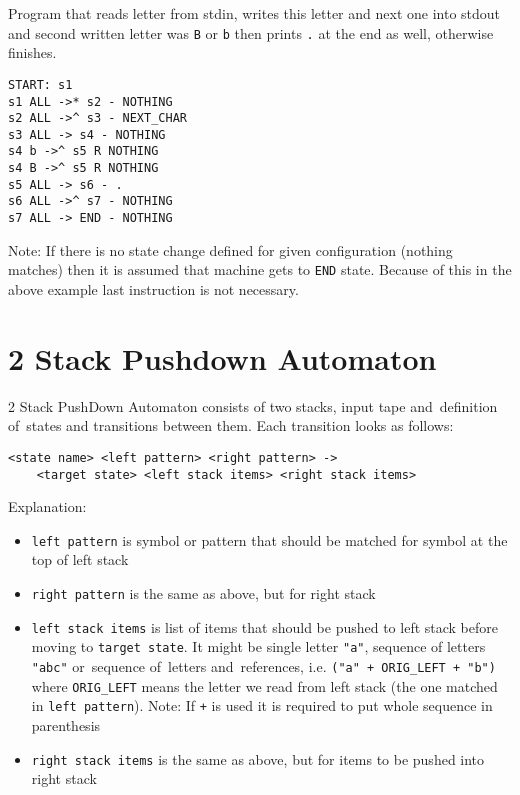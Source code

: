 \documentclass[english,shortabstract,mgr]{iithesis}
\begin{document}
Program that reads letter from stdin, writes this letter and next one into
stdout and second written letter was \texttt{B} or \texttt{b} then prints
\texttt{.} at the end as well, otherwise finishes.

\begin{verbatim}
START: s1
s1 ALL ->* s2 - NOTHING
s2 ALL ->^ s3 - NEXT_CHAR
s3 ALL -> s4 - NOTHING
s4 b ->^ s5 R NOTHING
s4 B ->^ s5 R NOTHING
s5 ALL -> s6 - .
s6 ALL ->^ s7 - NOTHING
s7 ALL -> END - NOTHING
\end{verbatim}

Note: If there is no state change defined for given configuration
(nothing matches) then it is assumed that machine gets to \texttt{END} state.
Because of this in the above example last instruction is not necessary.

\section {2 Stack Pushdown Automaton}

2 Stack PushDown Automaton consists of two stacks, input tape and~definition
of~states and transitions between them. Each transition looks as follows:
\begin{verbatim}
<state name> <left pattern> <right pattern> ->
    <target state> <left stack items> <right stack items>
\end{verbatim}

Explanation:
\begin{itemize}
  \item \texttt{left pattern} is symbol or pattern that should be matched
      for symbol at the top of left stack
  \item \texttt{right pattern} is the same as above, but for right stack
  \item \texttt{left stack items} is list of items that should be pushed to left stack before moving
      to \texttt{target state}. It might be single letter \texttt{"a"}, sequence of letters
      \texttt{"abc"} or~sequence of~letters and~references, i.e. \texttt{("a" + ORIG\_LEFT + "b")}
      where \texttt{ORIG\_LEFT} means the letter we read from left stack (the one matched
      in \texttt{left pattern}). Note: If \texttt{+} is used it is required to put whole sequence in parenthesis
  \item \texttt{right stack items} is the same as above, but for items to be pushed into right stack
\end{itemize}
\end{document}
